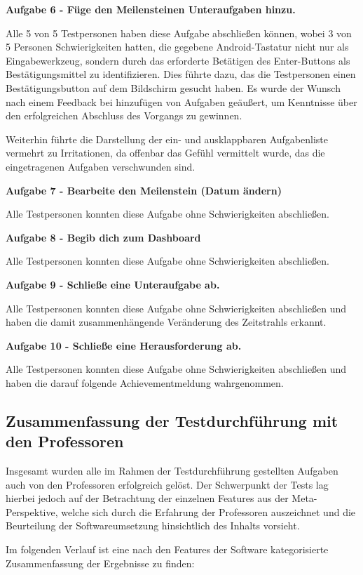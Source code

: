 \documentclass[bibliography=totoc,listof=totoc,BCOR=5mm,DIV=12,oneside]{scrbook}
\begin{document}
\par \bigskip \textbf{Aufgabe 6 - Füge den Meilensteinen Unteraufgaben hinzu.}
\par Alle 5 von 5 Testpersonen haben diese Aufgabe abschließen können, wobei 3 von 5 Personen Schwierigkeiten hatten, die gegebene Android-Tastatur nicht nur als Eingabewerkzeug, sondern durch das erforderte Betätigen des Enter-Buttons als Bestätigungsmittel zu identifizieren. Dies führte dazu, das die Testpersonen einen Bestätigungsbutton auf dem Bildschirm gesucht haben. Es wurde der Wunsch nach einem Feedback bei hinzufügen von Aufgaben geäußert, um Kenntnisse über den erfolgreichen Abschluss des Vorgangs zu gewinnen.
\par Weiterhin führte die Darstellung der ein- und ausklappbaren Aufgabenliste vermehrt zu Irritationen, da offenbar das Gefühl vermittelt wurde, das die eingetragenen Aufgaben verschwunden sind.

\par \bigskip \textbf{Aufgabe 7 - Bearbeite den Meilenstein (Datum ändern)}
\par Alle Testpersonen konnten diese Aufgabe ohne Schwierigkeiten abschließen.

\par \bigskip \textbf{Aufgabe 8 - Begib dich zum Dashboard}
\par Alle Testpersonen konnten diese Aufgabe ohne Schwierigkeiten abschließen.

\par \bigskip \textbf{Aufgabe 9 - Schließe eine Unteraufgabe ab.}
\par Alle Testpersonen konnten diese Aufgabe ohne Schwierigkeiten abschließen und haben die damit zusammenhängende Veränderung des Zeitstrahls erkannt.

\par \bigskip \textbf{Aufgabe 10 - Schließe eine Herausforderung ab.}
\par Alle Testpersonen konnten diese Aufgabe ohne Schwierigkeiten abschließen und haben die darauf folgende Achievementmeldung wahrgenommen.

\newpage
\subsection{Zusammenfassung der Testdurchführung mit den Professoren}
\par Insgesamt wurden alle im Rahmen der Testdurchführung gestellten Aufgaben auch von den Professoren erfolgreich gelöst. Der Schwerpunkt der Tests lag hierbei jedoch auf der Betrachtung der einzelnen Features aus der Meta-Perspektive, welche sich durch die Erfahrung der Professoren auszeichnet und die Beurteilung der Softwareumsetzung hinsichtlich des Inhalts vorsieht.
\par \bigskip Im folgenden Verlauf ist eine nach den Features der Software kategorisierte Zusammenfassung der Ergebnisse zu finden:
\end{document}
